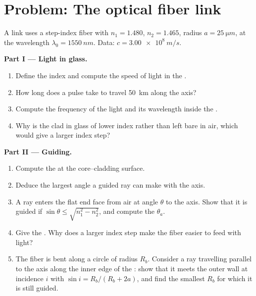 \section{Problem: The optical fiber link}

\begin{problem}
\label{pb:b1:rays-reflection-refraction:1}
A link uses a step-index fiber with  $n_1 = 1.480$, 
$n_2 = 1.465$,  radius $a = \qty{25}{\micro m}$, at the wavelength
$\lambda_0 = \qty{1550}{nm}$. Data: $c = \qty{3.00e8}{m/s}$.

\medskip
\noindent\textbf{Part I --- Light in glass.}
\begin{enumerate}
  \item Define the index and compute the speed of light in the .
  \item How long does a pulse take to travel \qty{50}{km} along the
        axis?
  \item Compute the frequency of the light and its wavelength inside the
        .
  \item Why is the  clad in glass of lower index rather than left
        bare in air, which would give a larger index step?
\end{enumerate}

\medskip
\noindent\textbf{Part II --- Guiding.}
\begin{enumerate}[resume]
  \item Compute the  at the core--cladding surface.
  \item Deduce the largest angle a guided ray can make with the axis.
  \item A ray enters the flat end face from air at angle $\theta$ to
        the axis. Show that it is guided if $\sin\theta \leq
        \sqrt{n_1^2 - n_2^2}$, and compute the 
        $\theta_a$.
  \item Give the . Why does a larger index step make
        the fiber easier to feed with light?
  \item The fiber is bent along a circle of radius $R_b$. Consider a
        ray travelling parallel to the axis along the inner edge of the
        : show that it meets the outer wall at incidence $i$ with
        $\sin i = R_b/(R_b + 2a)$, and find the smallest $R_b$ for which
        it is still guided.
\end{enumerate}


\end{problem}
